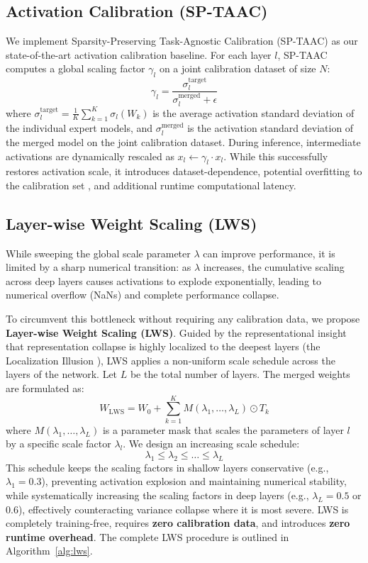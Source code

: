\documentclass{article}
\theoremstyle{plain}
\theoremstyle{definition}
\theoremstyle{remark}
\begin{document}
\subsection{Activation Calibration (SP-TAAC)}
We implement Sparsity-Preserving Task-Agnostic Calibration (SP-TAAC) \cite{sp_taac} as our state-of-the-art activation calibration baseline. For each layer $l$, SP-TAAC computes a global scaling factor $\gamma_l$ on a joint calibration dataset of size $N$:
\begin{equation}
    \gamma_l = \frac{\sigma^{\text{target}}_l}{\sigma^{\text{merged}}_l + \epsilon}
\end{equation}
where $\sigma^{\text{target}}_l = \frac{1}{K} \sum_{k=1}^K \sigma_l(W_k)$ is the average activation standard deviation of the individual expert models, and $\sigma^{\text{merged}}_l$ is the activation standard deviation of the merged model on the joint calibration dataset. During inference, intermediate activations are dynamically rescaled as $x_l \leftarrow \gamma_l \cdot x_l$. While this successfully restores activation scale, it introduces dataset-dependence, potential overfitting to the calibration set \cite{overfitting}, and additional runtime computational latency.

\subsection{Layer-wise Weight Scaling (LWS)}
While sweeping the global scale parameter $\lambda$ can improve performance, it is limited by a sharp numerical transition: as $\lambda$ increases, the cumulative scaling across deep layers causes activations to explode exponentially, leading to numerical overflow (NaNs) and complete performance collapse.

To circumvent this bottleneck without requiring any calibration data, we propose \textbf{Layer-wise Weight Scaling (LWS)}. Guided by the representational insight that representation collapse is highly localized to the deepest layers (the Localization Illusion \cite{deconstructing_cal}), LWS applies a non-uniform scale schedule across the layers of the network. Let $L$ be the total number of layers. The merged weights are formulated as:
\begin{equation}
    W_{\text{LWS}} = W_0 + \sum_{k=1}^K M(\lambda_1, \ldots, \lambda_L) \odot T_k
\end{equation}
where $M(\lambda_1, \ldots, \lambda_L)$ is a parameter mask that scales the parameters of layer $l$ by a specific scale factor $\lambda_l$. We design an increasing scale schedule:
\begin{equation}
    \lambda_1 \le \lambda_2 \le \ldots \le \lambda_L
\end{equation}
This schedule keeps the scaling factors in shallow layers conservative (e.g., $\lambda_1 = 0.3$), preventing activation explosion and maintaining numerical stability, while systematically increasing the scaling factors in deep layers (e.g., $\lambda_L = 0.5$ or $0.6$), effectively counteracting variance collapse where it is most severe. LWS is completely training-free, requires \textbf{zero calibration data}, and introduces \textbf{zero runtime overhead}. The complete LWS procedure is outlined in Algorithm~\ref{alg:lws}.
\end{document}
